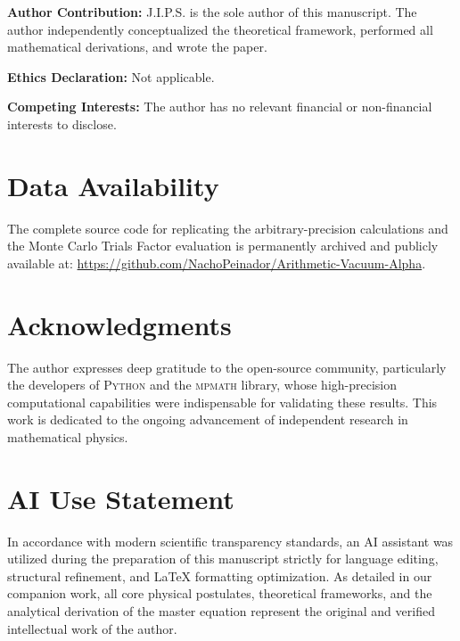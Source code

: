 \documentclass[12pt,a4paper]{article}
\begin{document}
\vspace{0.5em}
\noindent\textbf{Author Contribution:} J.I.P.S. is the sole author of this manuscript. The author independently conceptualized the theoretical framework, performed all mathematical derivations, and wrote the paper.

\vspace{0.5em}
\noindent\textbf{Ethics Declaration:} Not applicable.

\vspace{0.5em}
\noindent\textbf{Competing Interests:} The author has no relevant financial or non-financial interests to disclose.

\section*{Data Availability}
The complete source code for replicating the arbitrary-precision calculations and the Monte Carlo Trials Factor evaluation is permanently archived and publicly available at: \url{https://github.com/NachoPeinador/Arithmetic-Vacuum-Alpha}.

\section*{Acknowledgments}
The author expresses deep gratitude to the open-source community, particularly the developers of \textsc{Python} and the \textsc{mpmath} library, whose high-precision computational capabilities were indispensable for validating these results. This work is dedicated to the ongoing advancement of independent research in mathematical physics.

\section*{AI Use Statement}
In accordance with modern scientific transparency standards, an AI assistant was utilized during the preparation of this manuscript strictly for language editing, structural refinement, and LaTeX formatting optimization. As detailed in our companion work, all core physical postulates, theoretical frameworks, and the analytical derivation of the master equation represent the original and verified intellectual work of the author.

\end{document}

